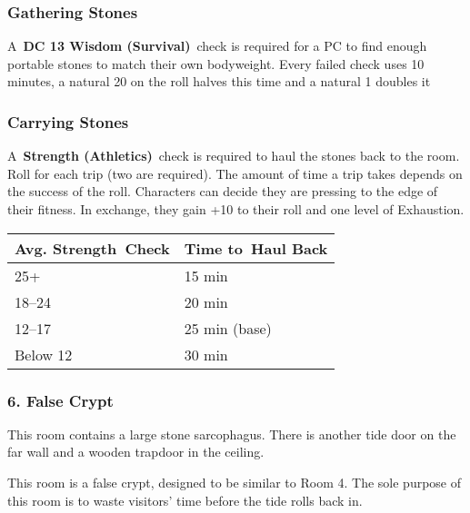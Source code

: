 \documentclass[10pt,twocolumn]{article}
\let\oldtextbf\textbf
\renewcommand{\textbf}[1]{\oldtextbf{{#1}}}
\renewenvironment{quote}
  {%
    \begingroup
      \setlength{\parindent}{1em}%
      \setlength{\parskip}{0pt}%
      \begin{tcolorbox}[myquote,
        before upper={%
          \let\textbf\oldtextbf
          \setlength{\parindent}{1.5em}%
          \setlength{\parskip}{0pt}%
          \noindent              %
        }%
      ]%
  }
  {%
      \end{tcolorbox}%
    \endgroup
  }
\begin{document}
\subsubsection{Gathering Stones}\label{gathering-stones}

A~\textbf{DC 13 Wisdom (Survival)}~check is required for a PC to find
enough portable stones to match their own bodyweight. Every failed check
uses 10 minutes, a natural 20 on the roll halves this time and a natural
1 doubles it

\subsubsection{Carrying Stones}\label{carrying-stones}

A~\textbf{Strength (Athletics)}~check is required to haul the stones
back to the room. Roll for each trip (two are required). The amount of
time a trip takes depends on the success of the roll. Characters can
decide they are pressing to the edge of their fitness. In exchange, they
gain +10 to their roll and one level of Exhaustion.

\begin{center}
{\sffamily\fontsize{8pt}{8pt}\selectfont
{}
\begin{tabular}{ll}
\toprule
\textbf{Avg. Strength Check} & \textbf{Time to Haul Back} \\
\midrule
25+ & 15 min \\
18--24 & 20 min \\
12–17 & 25 min (base) \\
Below 12 & 30 min \\
\bottomrule
\end{tabular}}
\end{center}

\subsubsection{6. False Crypt}\label{false-crypt}

\begin{quote}
This room contains a large stone sarcophagus. There is another tide door
on the far wall and a wooden trapdoor in the ceiling.
\end{quote}

This room is a false crypt, designed to be similar to Room 4. The sole
purpose of this room is to waste visitors' time before the tide rolls
back in.
\end{document}
